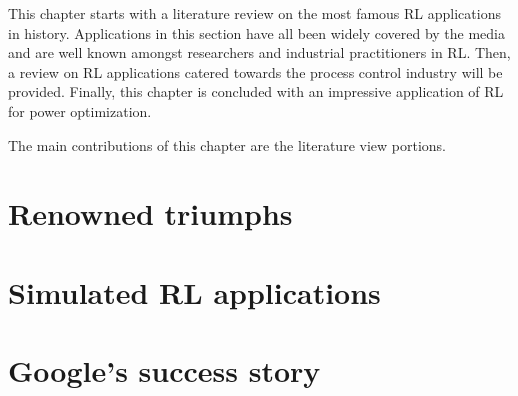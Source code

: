%
%
% 

This chapter starts with a literature review on the most famous RL applications in history.  Applications in this section have all been widely covered by the media and are well known amongst researchers and industrial practitioners in RL.  Then, a review on RL applications catered towards the process control industry will be provided. Finally, this chapter is concluded with an impressive application of RL for power optimization.

The main contributions of this chapter are the literature view portions.

\section{Renowned triumphs}

\section{Simulated RL applications}

\section{Google's success story}
